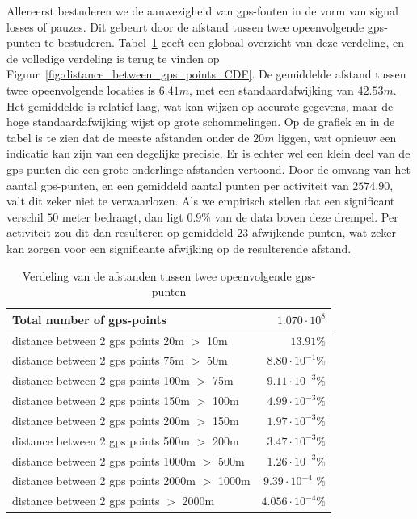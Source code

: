 Allereerst bestuderen we de aanwezigheid van \ac{gps}-fouten in de vorm van
signal losses of pauzes. Dit gebeurt door de afstand tussen twee opeenvolgende
\ac{gps}-punten te bestuderen.
Tabel~\ref{tab:distance_between_gps_points_table} geeft een globaal overzicht
van deze verdeling, en de volledige verdeling is terug te vinden op
Figuur~\ref{fig:distance_between_gps_points_CDF}. De gemiddelde afstand tussen
twee opeenvolgende locaties is $6.41m$, met een standaardafwijking van
$42.53m$. Het gemiddelde is relatief laag, wat kan wijzen op accurate gegevens,
maar de hoge standaardafwijking wijst op grote schommelingen. Op de grafiek en
in de tabel is te zien dat de meeste afstanden onder de $20m$ liggen, wat
opnieuw een indicatie kan zijn van een degelijke precisie. Er is echter wel een
klein deel van de \ac{gps}-punten die een grote onderlinge afstanden vertoond.
Door de omvang van het aantal \ac{gps}-punten, en een gemiddeld aantal punten
per activiteit van $2574.90$, valt dit zeker niet te verwaarlozen. Als we
empirisch stellen dat een significant verschil $50$ meter bedraagt, dan ligt
0.9\% van de data boven deze drempel. Per activiteit zou dit dan resulteren op
gemiddeld $23$ afwijkende punten, wat zeker kan zorgen voor een significante
afwijking op de resulterende afstand.
\begin{table}[h]
    \centering
    \begin{tabular}{lr}
        \toprule
        \midrule
        Total number of gps-points                    & $1.070 \cdot 10^8$       \\
        \hline
        distance between 2 gps points 20m $>$ 10m     & $13.91\%$                \\
        distance between 2 gps points 75m $>$ 50m     & $8.80 \cdot 10^{-1}\%$   \\
        distance between 2 gps points 100m $>$ 75m    & $9.11 \cdot 10^{-3}\%$   \\
        distance between 2 gps points 150m $>$ 100m   & $4.99 \cdot 10^{-3}\%$   \\
        distance between 2 gps points 200m $>$ 150m   & $1.97 \cdot 10^{-3}\%$   \\
        distance between 2 gps points 500m $>$ 200m   & $3.47 \cdot  10^{-3} \%$ \\
        distance between 2 gps points 1000m $>$ 500m  & $1.26 \cdot 10^{-3} \%$  \\
        distance between 2 gps points 2000m $>$ 1000m & $9.39 \cdot 10^{-4}$ \%  \\
        distance between 2 gps points $>$ 2000m       & $4.056 \cdot 10^{-4} \%$ \\
        \midrule
        \bottomrule
    \end{tabular}
    \captionsetup{justification=centering}
    \caption{Verdeling van de afstanden tussen twee opeenvolgende gps-punten}\label{tab:distance_between_gps_points_table}
\end{table}
